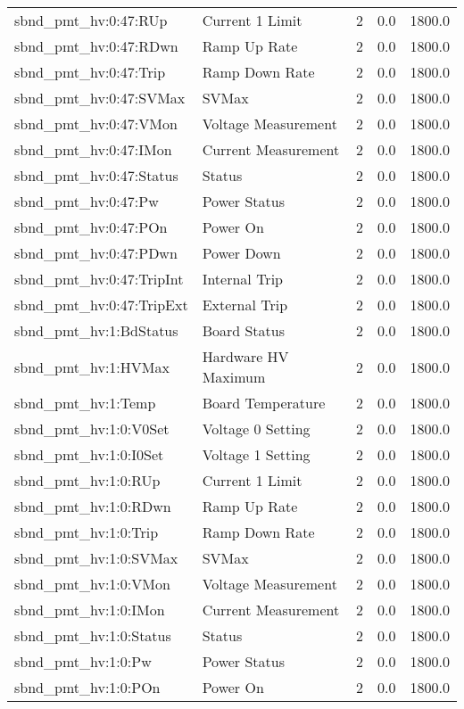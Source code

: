 \begin{center}
\begin{longtable}{l | l l l l }
sbnd\_pmt\_hv:0:47:RUp & Current 1 Limit & 2 & 0.0 & 1800.0\\ 
sbnd\_pmt\_hv:0:47:RDwn & Ramp Up Rate & 2 & 0.0 & 1800.0\\ 
sbnd\_pmt\_hv:0:47:Trip & Ramp Down Rate & 2 & 0.0 & 1800.0\\ 
sbnd\_pmt\_hv:0:47:SVMax & SVMax & 2 & 0.0 & 1800.0\\ 
sbnd\_pmt\_hv:0:47:VMon & Voltage Measurement & 2 & 0.0 & 1800.0\\ 
sbnd\_pmt\_hv:0:47:IMon & Current Measurement & 2 & 0.0 & 1800.0\\ 
sbnd\_pmt\_hv:0:47:Status & Status & 2 & 0.0 & 1800.0\\ 
sbnd\_pmt\_hv:0:47:Pw & Power Status & 2 & 0.0 & 1800.0\\ 
sbnd\_pmt\_hv:0:47:POn & Power On & 2 & 0.0 & 1800.0\\ 
sbnd\_pmt\_hv:0:47:PDwn & Power Down & 2 & 0.0 & 1800.0\\ 
sbnd\_pmt\_hv:0:47:TripInt & Internal Trip & 2 & 0.0 & 1800.0\\ 
sbnd\_pmt\_hv:0:47:TripExt & External Trip & 2 & 0.0 & 1800.0\\ 
sbnd\_pmt\_hv:1:BdStatus & Board Status & 2 & 0.0 & 1800.0\\ 
sbnd\_pmt\_hv:1:HVMax & Hardware HV Maximum & 2 & 0.0 & 1800.0\\ 
sbnd\_pmt\_hv:1:Temp & Board Temperature & 2 & 0.0 & 1800.0\\ 
sbnd\_pmt\_hv:1:0:V0Set & Voltage 0 Setting & 2 & 0.0 & 1800.0\\ 
sbnd\_pmt\_hv:1:0:I0Set & Voltage 1 Setting & 2 & 0.0 & 1800.0\\ 
sbnd\_pmt\_hv:1:0:RUp & Current 1 Limit & 2 & 0.0 & 1800.0\\ 
sbnd\_pmt\_hv:1:0:RDwn & Ramp Up Rate & 2 & 0.0 & 1800.0\\ 
sbnd\_pmt\_hv:1:0:Trip & Ramp Down Rate & 2 & 0.0 & 1800.0\\ 
sbnd\_pmt\_hv:1:0:SVMax & SVMax & 2 & 0.0 & 1800.0\\ 
sbnd\_pmt\_hv:1:0:VMon & Voltage Measurement & 2 & 0.0 & 1800.0\\ 
sbnd\_pmt\_hv:1:0:IMon & Current Measurement & 2 & 0.0 & 1800.0\\ 
sbnd\_pmt\_hv:1:0:Status & Status & 2 & 0.0 & 1800.0\\ 
sbnd\_pmt\_hv:1:0:Pw & Power Status & 2 & 0.0 & 1800.0\\ 
sbnd\_pmt\_hv:1:0:POn & Power On & 2 & 0.0 & 1800.0\\ 

\end{longtable}
\end{center}

